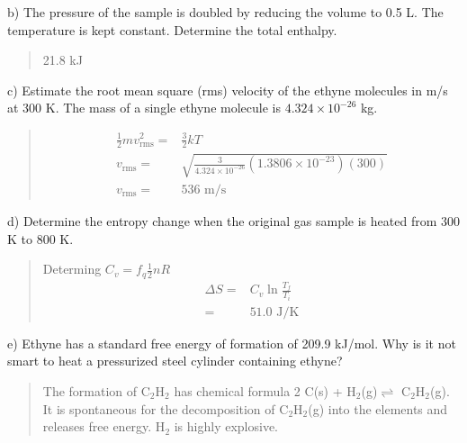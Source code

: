 \documentclass[11pt]{article}
\newcommand{\brian}[1]{
  {\begin{quote}
      \color{blue} #1
  \end{quote}}
}
\begin{document}
b) The pressure of the sample is doubled by reducing the volume to 0.5 L. The
temperature is kept constant. Determine the total enthalpy.

\brian{21.8 kJ}

c) Estimate the root mean square (rms) velocity of the ethyne molecules in m/s at 300 K.
The mass of a single ethyne molecule is $4.324\times 10^{-26}$ kg.

\brian{
  \begin{align*}
    \frac{1}{2}mv^2_\text{rms} = & \frac{3}{2}kT \\
    v_\text{rms} = & \sqrt{\frac{3}{4.324\times 10^{-26}}(1.3806\times 10^{-23})(300)} \\
    v_\text{rms} = & 536 \text{ m/s}
  \end{align*}
}

d) Determine the entropy change when the original gas sample is heated from 300 K to
800 K.

\brian{Determing $C_v = f_q\frac{1}{2}nR$
  \begin{align*}
    \Delta S = & C_v\ln\frac{T_f}{T_i} \\
    = & 51.0 \text{ J/K}
  \end{align*}
}

e) Ethyne has a standard free energy of formation of 209.9 kJ/mol. Why is it not smart
to heat a pressurized steel cylinder containing ethyne?

\brian{The formation of C$_2$H$_2$ has chemical formula 2 C(s) + H$_2$(g)$\rightleftharpoons$ C$_2$H$_2$(g).
  It is spontaneous for the decomposition of C$_2$H$_2$(g) into the elements and releases free energy.
  H$_2$ is highly explosive.
}
\end{document}
